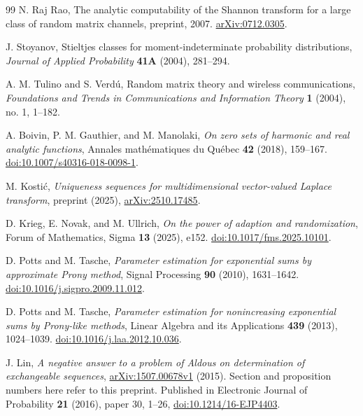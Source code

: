 \documentclass[11pt,letterpaper]{article}
\theoremstyle{definition}
\theoremstyle{remark}
\newcommand{\1}{\mathbf 1}
\begin{document}
\begin{thebibliography}{99}
N. Raj Rao,
The analytic computability of the Shannon transform for a large class
of random matrix channels,
preprint, 2007.
\href{https://arxiv.org/abs/0712.0305}{arXiv:0712.0305}.


J. Stoyanov,
Stieltjes classes for moment-indeterminate probability distributions,
\emph{Journal of Applied Probability} \textbf{41A} (2004), 281--294.


A. M. Tulino and S. Verd\'u,
Random matrix theory and wireless communications,
\emph{Foundations and Trends in Communications and Information Theory}
\textbf{1} (2004), no. 1, 1--182.


A. Boivin, P. M. Gauthier, and M. Manolaki,
\emph{On zero sets of harmonic and real analytic functions},
Annales math\'ematiques du Qu\'ebec \textbf{42} (2018), 159--167.
\href{https://doi.org/10.1007/s40316-018-0098-1}{doi:10.1007/s40316-018-0098-1}.


M. Kosti\'c,
\emph{Uniqueness sequences for multidimensional vector-valued Laplace transform},
preprint (2025),
\href{https://arxiv.org/abs/2510.17485}{arXiv:2510.17485}.


D. Krieg, E. Novak, and M. Ullrich,
\emph{On the power of adaption and randomization},
Forum of Mathematics, Sigma \textbf{13} (2025), e152.
\href{https://doi.org/10.1017/fms.2025.10101}{doi:10.1017/fms.2025.10101}.


D. Potts and M. Tasche,
\emph{Parameter estimation for exponential sums by approximate Prony method},
Signal Processing \textbf{90} (2010), 1631--1642.
\href{https://doi.org/10.1016/j.sigpro.2009.11.012}{doi:10.1016/j.sigpro.2009.11.012}.


D. Potts and M. Tasche,
\emph{Parameter estimation for nonincreasing exponential sums by
Prony-like methods},
Linear Algebra and its Applications \textbf{439} (2013), 1024--1039.
\href{https://doi.org/10.1016/j.laa.2012.10.036}{doi:10.1016/j.laa.2012.10.036}.


J. Lin,
\emph{A negative answer to a problem of Aldous on determination of
exchangeable sequences},
\href{https://arxiv.org/abs/1507.00678v1}{arXiv:1507.00678v1} (2015).
Section and proposition numbers here refer to this preprint.
Published in Electronic Journal of Probability \textbf{21} (2016),
paper 30, 1--26,
\href{https://doi.org/10.1214/16-EJP4403}{doi:10.1214/16-EJP4403}.



\end{thebibliography}
\end{document}
